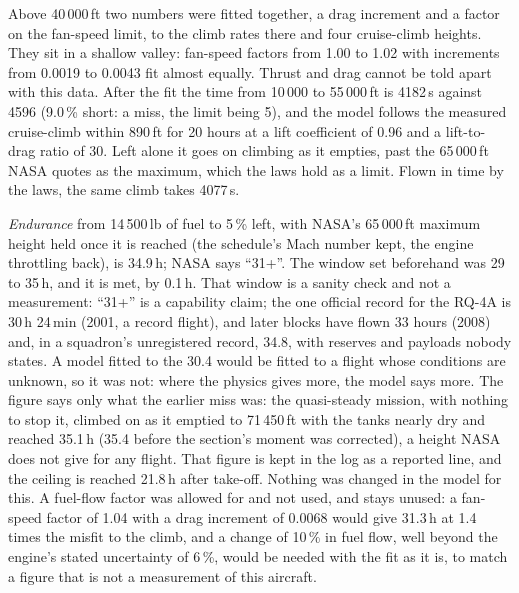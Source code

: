 \documentclass[10pt,a4paper,twocolumn]{article}
\begin{document}
Above 40\,000\,ft two numbers were fitted together, a drag increment and a factor on the fan-speed limit, to the climb rates there and four cruise-climb
heights. They sit in a shallow valley: fan-speed factors from 1.00 to 1.02 with increments from 0.0019 to 0.0043 fit almost equally. Thrust and drag
cannot be told apart with this data. After the fit the time from 10\,000 to 55\,000\,ft is 4182\,s against 4596 (9.0\,\% short: a miss, the limit being 5), and the model follows the measured
cruise-climb within 890\,ft for 20 hours at a lift coefficient of 0.96 and a lift-to-drag ratio of 30. Left alone it goes on climbing as it empties, past the
65\,000\,ft NASA quotes as the maximum, which the laws hold as a limit. Flown in time by the laws, the same climb takes 4077\,s.

\emph{Endurance} from 14\,500\,lb of fuel to 5\,\% left, with NASA's 65\,000\,ft maximum height held once it is reached (the schedule's Mach number
kept, the engine throttling back), is 34.9\,h; NASA says ``31+''. The window set beforehand was 29 to 35\,h, and it is met, by 0.1\,h. That window is a sanity check and not a measurement:
``31+'' is a capability claim; the one official record for the RQ-4A is 30\,h 24\,min (2001, a record flight), and later blocks have flown 33 hours (2008)
and, in a squadron's unregistered record, 34.8, with reserves and payloads nobody states. A model fitted to the 30.4 would be fitted to a flight
whose conditions are unknown, so it was not: where the physics gives more, the model says more. The figure says only what the earlier miss was: the quasi-steady mission, with nothing to stop it, climbed on as it emptied to 71\,450\,ft with the tanks nearly dry and
reached 35.1\,h (35.4 before the section's moment was corrected), a height NASA does not give for any flight. That figure is kept in the log as a reported
line, and the ceiling is reached 21.8\,h after take-off. Nothing was changed in the model for this. A fuel-flow
factor was allowed for and not used, and stays unused: a fan-speed factor of 1.04 with a drag increment of 0.0068 would give 31.3\,h at 1.4 times the misfit to
the climb, and a change of 10\,\% in fuel flow, well beyond the engine's stated uncertainty of 6\,\%, would be needed with the fit as it is, to match a
figure that is not a measurement of this aircraft.
\end{document}
